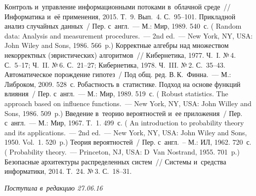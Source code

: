 \begin{multicols}{2}
{{\begin{thebibliography}{99}
 Контроль и~управление 
информационными потоками в~облачной среде~// Информатика и~её 
применения, 2015. Т.~9. Вып.~4. С.~95--101.
 Прикладной анализ случайных данных~/ Пер. 
с~англ.~--- М.: Мир, 1989. 540~с. ( Random data: 
Analysis and measurement procedures.~--- 2nd ed.~--- New York, NY, USA: John 
Wiley and Sons, 1986. 566~p.)
 Корректные алгебры над множеством некорректных 
(эвристических) алгоритмов~// Кибернетика, 1977. Ч.~I. №\,4. С.~5--17; Ч.~II.  
№\,6. С.~21--27; Кибернетика,  1978. Ч.~III. №\,2. С.~35--43.
 Автоматическое по\-рож\-де\-ние гипотез~/
Под общ. ред. В.\,К.~Финна.~--- 
М.: Либроком, 2009. 528~с. 
 Робастность 
в~статистике. Подход на основе функций влияния~/ Пер. с~англ.~--- М.: Мир, 
1989. 519~с. ( 
Robust statistics. The approach based on influence functions.~--- New York, NY, 
USA: John Willey and Sons, 1986. 509~p.)
 Введение в~теорию вероятностей и~ее приложения~/ Пер. 
с~англ.~--- М.: Мир, 1967. Т.~1. 499~с. ( An introduction to 
probability theory and its applications.~--- 2nd ed.~--- New York, NY, USA: John 
Wiley and Sons, 1950. Vol.~1. 520~p.)
 Теория вероятностей~/ Пер. с~англ.~-- М.: ИЛ, 
1962. 720~с. ( Probability theory.~--- 
Princeton, NJ, USA: D~Van Nostrand, 1955. 701~p.)
  Безопасные 
архитектуры распределенных сис\-тем~// Системы и~средства информатики, 
2014. Т.~24. №\,3. С.~18--31.
\end{thebibliography}

 }
 }

\end{multicols}

\vspace*{-12pt}

\hfill{\small\textit{Поступила в~редакцию 27.06.16}}


\newpage

\vspace*{-24pt}


